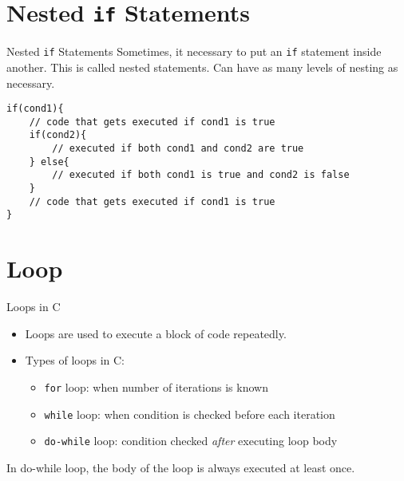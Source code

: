 \documentclass[12pt, aspectratio=169]{beamer}
\begin{document}





    \section{Nested \texttt{if} Statements}

    \begin{frame}[fragile]{Nested \texttt{if} Statements}
        Sometimes, it necessary to put an \texttt{if} statement inside another. This is called nested statements. Can have as many levels of nesting as necessary.

        \begin{verbatim}
if(cond1){
    // code that gets executed if cond1 is true
    if(cond2){
        // executed if both cond1 and cond2 are true
    } else{
        // executed if both cond1 is true and cond2 is false
    }
    // code that gets executed if cond1 is true
}
        \end{verbatim}
    \end{frame}




    \section{Loop}

    \begin{frame}{Loops in C}
        \begin{itemize}
            \item Loops are used to execute a block of code repeatedly.
            \item Types of loops in C:
            \begin{itemize}
                \item \texttt{for} loop: when number of iterations is known
                \item \texttt{while} loop: when condition is checked before each iteration
                \item \texttt{do-while} loop: condition checked \textit{after} executing loop body
            \end{itemize}
        \end{itemize}

        In do-while loop, the body of the loop is always executed at least once.
    \end{frame}
\end{document}
